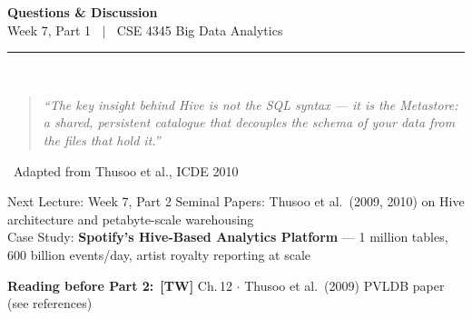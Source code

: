 \documentclass[aspectratio=169,10pt]{beamer}
\begin{document}
\begin{frame}[c]
  \begin{center}
    {\Large\bfseries Questions \& Discussion}\\[10pt]
    {\large Week 7, Part 1 $\;\mid\;$ CSE 4345 Big Data Analytics}\\[8pt]
    \textcolor{PUGray}{\rule{7cm}{0.5pt}}\\[10pt]
    \begin{quote}
      \itshape ``The key insight behind Hive is not the SQL syntax --- it is the Metastore: a shared, persistent catalogue that decouples the \textit{schema} of your data from the \textit{files} that hold it.''
    \end{quote}
    \hfill\textemdash\ Adapted from Thusoo et al., ICDE 2010
    \vspace{12pt}
    \begin{block}{\centering Next Lecture: Week 7, Part 2}
      \centering
      Seminal Papers: Thusoo et al.\ (2009, 2010) on Hive architecture and petabyte-scale warehousing\\[4pt]
      Case Study: \textbf{Spotify's Hive-Based Analytics Platform} ---
      1 million tables, 600 billion events/day, artist royalty reporting at scale
    \end{block}
    \vspace{6pt}
    \textbf{Reading before Part 2:}\ \textbf{[TW]} Ch.\,12 $\cdot$ Thusoo et al.\ (2009) PVLDB paper (see references)
  \end{center}
\end{frame}

\end{document}
